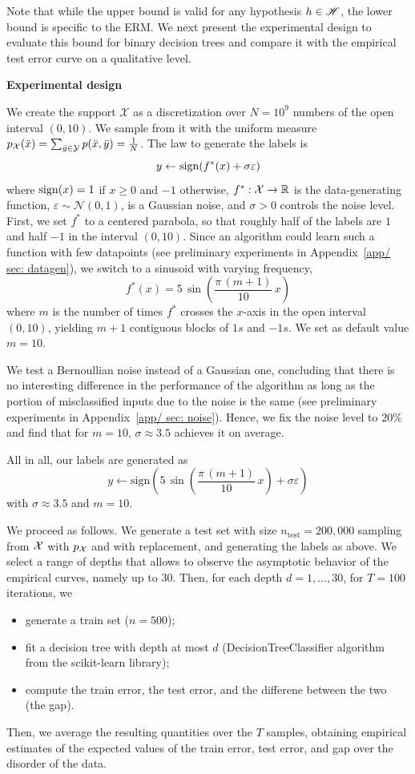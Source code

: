 \documentclass[reqno]{amsart}
\begin{document}
Note that while the upper bound is valid for any hypothesis $h\in\mathscr{H}$, the lower bound is specific to the ERM. 
We next present the experimental design to evaluate this bound for binary decision trees and compare it with the empirical test error curve on a qualitative level. 

{\bf Experimental design}

We create the support $\mathcal X$ as a discretization over $N= 10^9$ numbers of the open interval $(0,10)$. We sample from it with the uniform measure $p_{\mathcal{X}}(\bar x) = \sum_{\bar y\in \mathcal{Y}}p(\bar x, \bar y) = \frac{1}{N}$. 
The law to generate the labels is
\[
y \leftarrow \mathrm{sign}(f^*(x) + \sigma\varepsilon)
\] 
where $\mathrm{sign}(x) = 1$ if $x\ge 0$ and $-1$ otherwise, $f^*:\mathcal{X}\to\mathbb{R}$ is the data-generating function, $\varepsilon\sim\mathcal{N}(0,1)$, is a Gaussian noise, and $\sigma>0$ controls the noise level. 
First, we set $f^*$ to a centered parabola, so that roughly half of the labels are $1$ and half $-1$ in the interval $(0,10)$. 
Since an algorithm could learn such a function with few datapoints (see preliminary experiments in Appendix~\ref{app/ sec: datagen}), we switch to a sinusoid with varying frequency,
\begin{equation}\label{eq: sine}
    f^*(x) = 5\, \sin\left(\frac{\pi \,( m  +1)}{10}\, x\right)
\end{equation}
where $m$ is the number of times $f^*$ crosses the $x$-axis in the open interval $(0,10)$, yielding $m+1$ contiguous blocks of $1s$ and $-1s$. 
We set as default value $m=10$.

We test a Bernoullian noise instead of a Gaussian one, concluding that there is no interesting difference in the performance of the algorithm as long as the portion of misclassified inputs due to the noise is the same (see preliminary experiments in Appendix~\ref{app/ sec: noise}). Hence, we fix the noise level to $20\%$ and find that for $m = 10$, $\sigma \approx 3.5$ achieves it on average. 

All in all, our labels are generated as
 \[
    y \leftarrow \mathrm{sign}\left(5\, \sin\left(\frac{\pi \,( m  +1)}{10}\, x\right) + \sigma\varepsilon\right)
 \]
 with $\sigma \approx 3.5$ and $m = 10$.

We proceed as follows. We generate a test set with size $n_\text{test} = 200,000$ sampling from $\mathcal{X}$ with $p_{\mathcal{X}}$ and with replacement, and generating the labels as above. We select a range of depths that allows to observe the asymptotic behavior of the empirical curves, namely up to $30$. Then, for each depth $d = 1,\ldots, 30$, for $T=100$ iterations, we 
\begin{itemize}
    \item[$\cdot$] generate a train set ($n= 500$);
    \item[$\cdot$] fit a decision tree with depth at most $d$ (DecisionTreeClassifier algorithm from the scikit-learn library);
    \item[$\cdot$] compute the train error, the test error, and the differene between the two (the gap).
\end{itemize}
Then, we average the resulting quantities over the $T$ samples, obtaining empirical estimates of the expected values of the train error, test error, and gap over the disorder of the data. 
\end{document}
